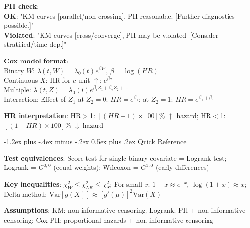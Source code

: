 ﻿\documentclass[10pt,letterpaper]{extarticle}
\makeatletter
\renewcommand{\section}{\@startsection{section}{1}{0mm}%
                                {-1.2ex plus -.4ex minus -.2ex}%
                                {0.5ex plus .2ex}%
                                {\normalfont\normalsize\bfseries}}
\newcommand{\h}[1]{\textbf{#1}}
\makeatother
\begin{document}
\begin{multicols}{3}
\h{PH check}: \\
\textbf{OK}: "KM curves [parallel/non-crossing], PH reasonable. [Further diagnostics possible.]" \\
\textbf{Violated}: "KM curves [cross/converge], PH may be violated. [Consider stratified/time-dep.]"

\h{Cox model format}: \\
Binary $W$: $\lambda(t,W)=\lambda_0(t)e^{\beta W}$, $\beta=\log(HR)$ \\
Continuous $X$: HR for $c$-unit $\uparrow$: $e^{\beta c}$ \\
Multiple: $\lambda(t,Z)=\lambda_0(t)e^{\beta_1 Z_1+\beta_2 Z_2+\cdots}$ \\
Interaction: Effect of $Z_1$ at $Z_2=0$: $HR=e^{\beta_1}$; at $Z_2=1$: $HR=e^{\beta_1+\beta_3}$

\h{HR interpretation}: HR$>$1: $[(HR-1)\times 100]\%$ $\uparrow$ hazard; HR$<$1: $[(1-HR)\times 100]\%$ $\downarrow$ hazard

\vspace{2pt}
\section{Quick Reference}

\h{Test equivalences}: Score test for single binary covariate = Logrank test; Logrank = $G^{0,0}$ (equal weights); Wilcoxon = $G^{1,0}$ (early differences)

\h{Key inequalities}: $\chi^2_W \le \chi^2_{LR} \le \chi^2_S$; For small $x$: $1-x \approx e^{-x}$, $\log(1+x) \approx x$; Delta method: $\text{Var}[g(X)] \approx [g'(\mu)]^2 \text{Var}(X)$

\h{Assumptions}: KM: non-informative censoring; Logrank: PH + non-informative censoring; Cox PH: proportional hazards + non-informative censoring

\end{multicols}
\end{document}
